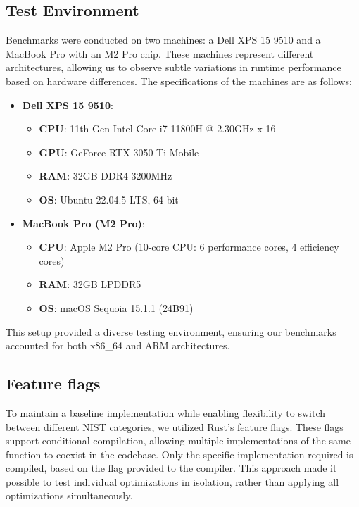 \documentclass[twoside,11pt]{report}
\theoremstyle{definition}
\theoremstyle{plain}
\begin{document}
\subsection{Test Environment}
Benchmarks were conducted on two machines: a Dell XPS 15 9510 and a MacBook Pro with an M2 Pro chip. These machines represent different architectures, allowing us to observe subtle variations in runtime performance based on hardware differences. The specifications of the machines are as follows:

\begin{itemize}
  \item \textbf{Dell XPS 15 9510}:
        \begin{itemize}
          \item \textbf{CPU}: 11th Gen Intel Core i7-11800H @ 2.30GHz x 16
          \item \textbf{GPU}: GeForce RTX 3050 Ti Mobile
          \item \textbf{RAM}: 32GB DDR4 3200MHz
          \item \textbf{OS}: Ubuntu 22.04.5 LTS, 64-bit
        \end{itemize}
  \item \textbf{MacBook Pro (M2 Pro)}:
        \begin{itemize}
          \item \textbf{CPU}: Apple M2 Pro (10-core CPU: 6 performance cores, 4 efficiency cores)
          \item \textbf{RAM}: 32GB LPDDR5
          \item \textbf{OS}: macOS Sequoia 15.1.1 (24B91)
        \end{itemize}
\end{itemize}
This setup provided a diverse testing environment, ensuring our benchmarks accounted for both x86\_64 and ARM architectures.

\subsection{Feature flags}\label{sub:feature_flags} %
To maintain a baseline implementation while enabling flexibility to switch between different NIST categories, we utilized Rust's feature flags. These flags support conditional compilation, allowing multiple implementations of the same function to coexist in the codebase. Only the specific implementation required is compiled, based on the flag provided to the compiler. This approach made it possible to test individual optimizations in isolation, rather than applying all optimizations simultaneously.
\end{document}

